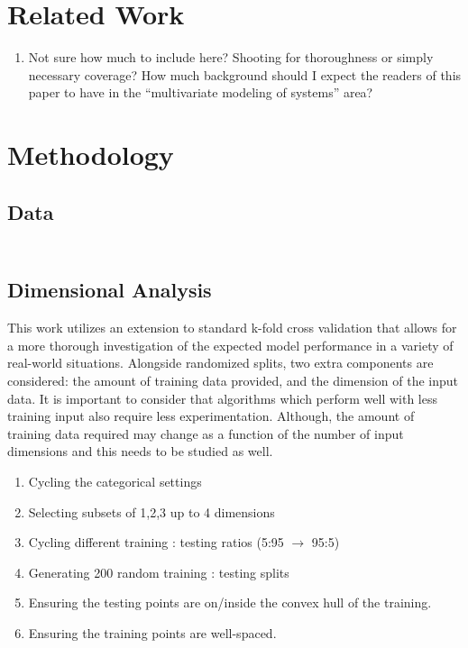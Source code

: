\documentclass{scspaperproc}
\theoremstyle{scsthe}
\begin{document}
\section{Related Work}
\begin{enumerate}
\item Not sure how much to include here? Shooting for thoroughness or
  simply necessary coverage? How much background should I expect the
  readers of this paper to have in the ``multivariate modeling of
  systems'' area?
\end{enumerate}


\section{Methodology}
\subsection{Data}

\begin{table}
  \centering
  \begin{tabular}{|c|c|}
    
  \end{tabular}
  \caption{}
  \label{tab:data_type}
\end{table}

\subsection{Dimensional Analysis}
This work utilizes an extension to standard k-fold cross validation
that allows for a more thorough investigation of the expected model
performance in a variety of real-world situations. Alongside
randomized splits, two extra components are considered: the amount of
training data provided, and the dimension of the input data. It is
important to consider that algorithms which perform well with less
training input also require less experimentation. Although, the amount
of training data required may change as a function of the number of
input dimensions and this needs to be studied as well.

\begin{enumerate}
\item Cycling the categorical settings
\item Selecting subsets of 1,2,3 up to 4 dimensions
\item Cycling different training : testing ratios (5:95 $\rightarrow$ 95:5)
\item Generating 200 random training : testing splits
\item Ensuring the testing points are on/inside the convex hull of the training.
\item Ensuring the training points are well-spaced.
\end{enumerate}
\end{document}
